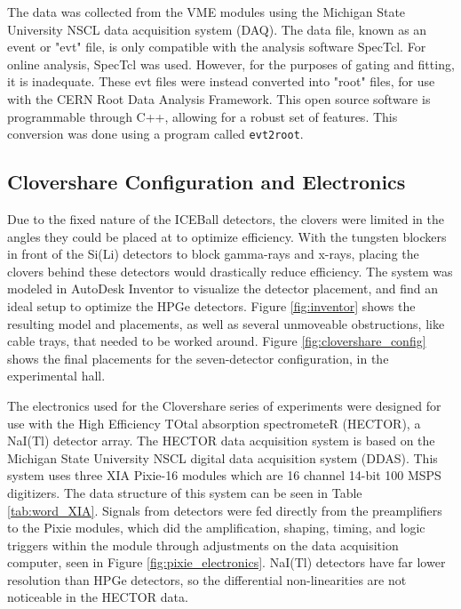 The data was collected from the VME modules using the Michigan State University NSCL data acquisition system (DAQ)\citep{nscl:_daq}. The data file, known as an event or "evt" file, is only compatible with the analysis software SpecTcl\citep{nscl:_daq}. For online analysis, SpecTcl was used. However, for the purposes of gating and fitting, it is inadequate. These evt files were instead converted into "root" files, for use with the CERN Root Data Analysis Framework\citep{brun97:_root}. This open source software is programmable through C++, allowing for a robust set of features. This conversion was done using a program called \texttt{evt2root}\citep{smith14:_evt2root}.

\subsection{Clovershare Configuration and Electronics}

Due to the fixed nature of the ICEBall detectors, the clovers were limited in the angles they could be placed at to optimize efficiency. With the tungsten blockers in front of the Si(Li) detectors to block gamma-rays and x-rays, placing the clovers behind these detectors would drastically reduce efficiency. The system was modeled in AutoDesk Inventor \citep{autodesk:_inventor} to visualize the detector placement, and find an ideal setup to optimize the HPGe detectors. Figure \ref{fig:inventor} shows the resulting model and placements, as well as several unmoveable obstructions, like cable trays, that needed to be worked around. Figure \ref{fig:clovershare_config} shows the final placements for the seven-detector configuration, in the experimental hall.





The electronics used for the Clovershare series of experiments were designed for use with the High Efficiency TOtal absorption spectrometeR (HECTOR), a NaI(Tl) detector array\citep{reingold19:_HECTOR}. The HECTOR data acquisition system is based on the Michigan State University NSCL digital data acquisition system (DDAS). This system uses three XIA Pixie-16 modules \citep{xia:_pixie} which are 16 channel 14-bit 100 MSPS digitizers. The data structure of this system can be seen in Table \ref{tab:word_XIA}. Signals from detectors were fed directly from the preamplifiers to the Pixie modules, which did the amplification, shaping, timing, and logic triggers within the module through adjustments on the data acquisition computer, seen in Figure \ref{fig:pixie_electronics}. NaI(Tl) detectors have far lower resolution than HPGe detectors, so the differential non-linearities are not noticeable in the HECTOR data.

